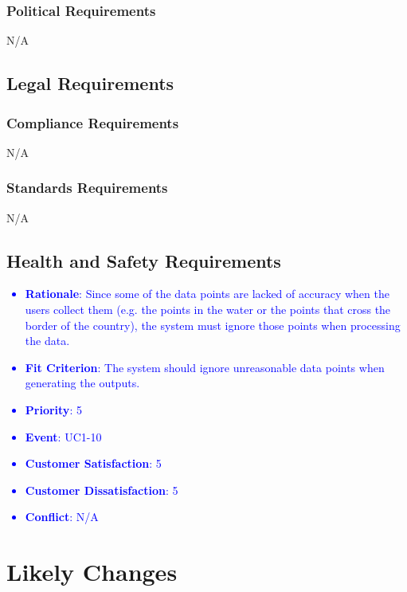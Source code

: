 \documentclass[12pt, titlepage]{article}
\newcounter{reqnum} %
\newcounter{freqnum} %
\begin{document}
\begin{itemize}
\subsubsection{Political Requirements}
N/A
\subsection{Legal Requirements}

\subsubsection{Compliance Requirements}
N/A
\subsubsection{Standards Requirements}
N/A
\subsection{Health and Safety Requirements}
\textcolor{blue}{
\item[NFR\refstepcounter{freqnum}\thefreqnum
\label{NFR}:] 
\begin{itemize}
    \item \textbf{Rationale}: Since some of the data points are lacked of accuracy when the users collect them (e.g. the points in the water or the points that cross the border of the country), the system must ignore those points when processing the data.
    \item \textbf{Fit Criterion}: The system should ignore unreasonable data points when generating the outputs.
    \item \textbf{Priority}: 5
    \item \textbf{Event}: UC1-10%
    \item \textbf{Customer Satisfaction}: 5
    \item \textbf{Customer Dissatisfaction}: 5
    \item \textbf{Conflict}: N/A
\end{itemize}
}


\end{itemize}
\section{Likely Changes}
\end{document}
